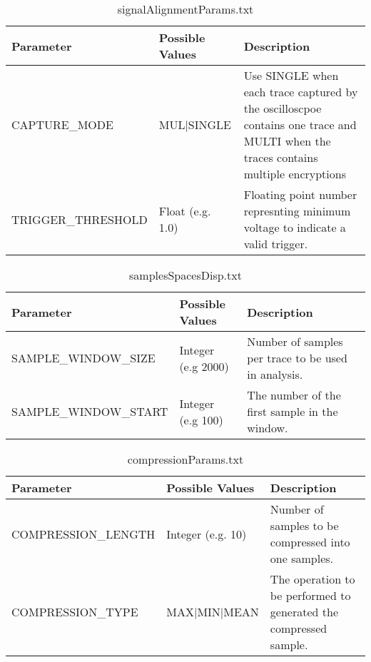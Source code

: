 \begin{table}[H]
  \begin{center}
    \caption{signalAlignmentParams.txt}
    \begin{tabular}{|p{4cm}|p{2cm}|p{7cm}|}
    	\hline
       Parameter & Possible Values  & Description \\ \hline
       CAPTURE\_MODE & MUL|SINGLE & Use SINGLE when each trace captured \newline by the oscilloscpoe 
       								contains one trace and MULTI when the traces contains multiple encryptions \\ \hline
       																						
    TRIGGER\_THRESHOLD  & Float (e.g. 1.0) & Floating point number represnting minimum voltage to indicate a valid trigger. \\ \hline
    
  \end{tabular}
  \end{center}
\end{table}


\begin{table}[H]
  \begin{center}
    \caption{samplesSpacesDisp.txt}
    \begin{tabular}{|p{4cm}|p{2cm}|p{7cm}|} \hline 
    Parameter & Possible Values  & Description \\ \hline   
    SAMPLE\_WINDOW\_SIZE & Integer (e.g 2000) & Number of samples per trace to be used in analysis. \\ \hline
	SAMPLE\_WINDOW\_START & Integer (e.g 100) & The number of the first sample in the window. \\ \hline
    
    \end{tabular}
  \end{center}
\end{table}


\begin{table}[H]
  \begin{center}
    \caption{compressionParams.txt}
    \begin{tabular}{|p{4cm}|p{2cm}|p{7cm}|} \hline 
    Parameter & Possible Values  & Description \\ \hline
    COMPRESSION\_LENGTH & Integer (e.g. 10) & Number of samples to be compressed into one samples. \\ \hline
	COMPRESSION\_TYPE & MAX|MIN|MEAN & The operation to be performed to generated the compressed sample. \\ \hline
    \end{tabular}
  \end{center}
\end{table}

